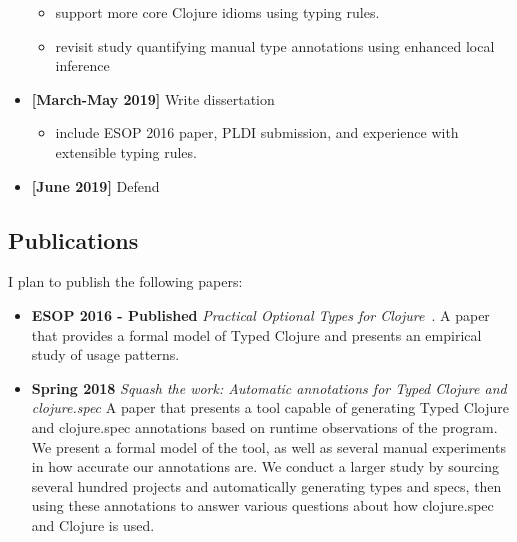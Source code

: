 \documentclass[9pt]{extarticle}
\begin{document}
\begin{itemize}
    \begin{itemize}
      \item support more core Clojure idioms using typing rules.
      \item revisit study quantifying manual type annotations using enhanced local inference
    \end{itemize}
  \item \textbf{[March-May 2019]} Write dissertation
    \begin{itemize}
      \item include ESOP 2016 paper, PLDI submission, and experience with extensible typing rules.
    \end{itemize}
  \item \textbf{[June 2019]} Defend
\end{itemize}

\subsection{Publications}

I plan to publish the following papers:

\begin{itemize}
  \item \textbf{ESOP 2016 - Published} \emph{Practical Optional Types for Clojure}~\cite{bonnaire2016practical}.
    A paper that provides a formal model of Typed Clojure and presents an empirical
    study of usage patterns.
  \item \textbf{Spring 2018} \emph{Squash the work: Automatic annotations for Typed Clojure and clojure.spec}
    A paper that presents a tool capable of generating Typed Clojure and clojure.spec
    annotations based on runtime observations of the program.
    We present a formal model of the tool, as well as several manual experiments in how
    accurate our annotations are.
    We conduct a larger study by sourcing several hundred projects and automatically
    generating types and specs, then using these annotations to answer various questions
    about how clojure.spec and Clojure is used.
\end{itemize}


\printbibliography
\end{document}
